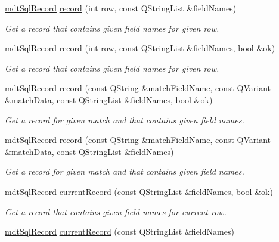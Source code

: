 \begin{DoxyCompactItemize}
\hyperlink{classmdt_sql_record}{mdt\-Sql\-Record} \hyperlink{classmdt_abstract_sql_table_controller_a1bf49f87908a1468bea5b9f3fc833a7c}{record} (int row, const Q\-String\-List \&field\-Names)
\begin{DoxyCompactList}\small\item\em Get a record that contains given field names for given row. \end{DoxyCompactList}\item 
\hyperlink{classmdt_sql_record}{mdt\-Sql\-Record} \hyperlink{classmdt_abstract_sql_table_controller_ae1f088f168d52b6253628a9a337a3adf}{record} (int row, const Q\-String\-List \&field\-Names, bool \&ok)
\begin{DoxyCompactList}\small\item\em Get a record that contains given field names for given row. \end{DoxyCompactList}\item 
\hyperlink{classmdt_sql_record}{mdt\-Sql\-Record} \hyperlink{classmdt_abstract_sql_table_controller_a9b83c25b5b8027bef36ab314be0b2a1c}{record} (const Q\-String \&match\-Field\-Name, const Q\-Variant \&match\-Data, const Q\-String\-List \&field\-Names, bool \&ok)
\begin{DoxyCompactList}\small\item\em Get a record for given match and that contains given field names. \end{DoxyCompactList}\item 
\hyperlink{classmdt_sql_record}{mdt\-Sql\-Record} \hyperlink{classmdt_abstract_sql_table_controller_a074c3b2a60e38acff2f754c6f2b787d8}{record} (const Q\-String \&match\-Field\-Name, const Q\-Variant \&match\-Data, const Q\-String\-List \&field\-Names)
\begin{DoxyCompactList}\small\item\em Get a record for given match and that contains given field names. \end{DoxyCompactList}\item 
\hyperlink{classmdt_sql_record}{mdt\-Sql\-Record} \hyperlink{classmdt_abstract_sql_table_controller_a68a9b5aa1baa7ed556c14111b07dd57a}{current\-Record} (const Q\-String\-List \&field\-Names, bool \&ok)
\begin{DoxyCompactList}\small\item\em Get a record that contains given field names for current row. \end{DoxyCompactList}\item 
\hyperlink{classmdt_sql_record}{mdt\-Sql\-Record} \hyperlink{classmdt_abstract_sql_table_controller_a0f397fe1d28fe99360a31479c023629f}{current\-Record} (const Q\-String\-List \&field\-Names)

\end{DoxyCompactItemize}
